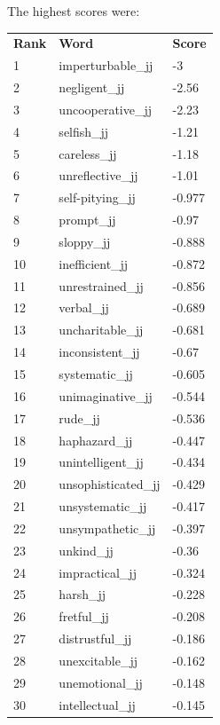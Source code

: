 \documentclass[10pt,letterpaper]{book}
\begin{document}
The highest scores were:
\begin{tabular}{ l l l }
        \textbf{Rank} & \textbf{Word} & \textbf{Score} \\
        1 & imperturbable\_jj & -3 \\
        2 & negligent\_jj & -2.56 \\
        3 & uncooperative\_jj & -2.23 \\
        4 & selfish\_jj & -1.21 \\
        5 & careless\_jj & -1.18 \\
        6 & unreflective\_jj & -1.01 \\
        7 & self-pitying\_jj & -0.977 \\
        8 & prompt\_jj & -0.97 \\
        9 & sloppy\_jj & -0.888 \\
        10 & inefficient\_jj & -0.872 \\
        11 & unrestrained\_jj & -0.856 \\
        12 & verbal\_jj & -0.689 \\
        13 & uncharitable\_jj & -0.681 \\
        14 & inconsistent\_jj & -0.67 \\
        15 & systematic\_jj & -0.605 \\
        16 & unimaginative\_jj & -0.544 \\
        17 & rude\_jj & -0.536 \\
        18 & haphazard\_jj & -0.447 \\
        19 & unintelligent\_jj & -0.434 \\
        20 & unsophisticated\_jj & -0.429 \\
        21 & unsystematic\_jj & -0.417 \\
        22 & unsympathetic\_jj & -0.397 \\
        23 & unkind\_jj & -0.36 \\
        24 & impractical\_jj & -0.324 \\
        25 & harsh\_jj & -0.228 \\
        26 & fretful\_jj & -0.208 \\
        27 & distrustful\_jj & -0.186 \\
        28 & unexcitable\_jj & -0.162 \\
        29 & unemotional\_jj & -0.148 \\
        30 & intellectual\_jj & -0.145 \\
\end{tabular}
\end{document}
